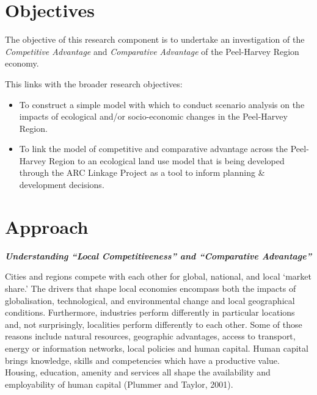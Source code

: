\documentclass[
]{book}
\begin{document}
\hypertarget{objectives-5}{%
\section{Objectives}\label{objectives-5}}

The objective of this research component is to undertake an investigation of the \emph{Competitive Advantage} and \emph{Comparative Advantage} of the Peel-Harvey Region economy.~

This links with the broader research objectives:

\begin{itemize}
\item
  To construct a simple model with which to conduct scenario analysis on the impacts of ecological and/or socio-economic changes in the Peel-Harvey Region.
\item
  To link the model of competitive and comparative advantage across the Peel-Harvey Region to an ecological land use model that is being developed through the ARC Linkage Project as a tool to inform planning \& development decisions.
\end{itemize}

\hypertarget{approach-4}{%
\section{Approach}\label{approach-4}}

\textbf{\emph{Understanding ``Local Competitiveness'' and ``Comparative Advantage''}}

Cities and regions compete with each other for global, national, and local `market share.' The drivers that shape local economies encompass both the impacts of globalisation, technological, and environmental change and local geographical conditions. Furthermore, industries perform differently in particular locations and, not surprisingly, localities perform differently to each other. Some of those reasons include natural resources, geographic advantages, access to transport, energy or information networks, local policies and human capital. Human capital brings knowledge, skills and competencies which have a productive value. Housing, education, amenity and services all shape the availability and employability of human capital (Plummer and Taylor, 2001).
\end{document}
